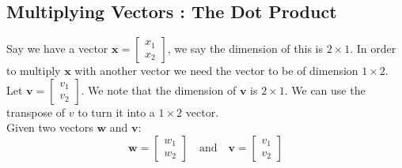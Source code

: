 \documentclass[9pt]{extarticle}
\theoremstyle{plain}
\theoremstyle{definition}
\theoremstyle{remark}
\begin{document}
\pagebreak

\subsection*{Multiplying Vectors : The Dot Product}
Say we have a vector $\mathbf{x} = \left[\begin{smallmatrix} x_1 \\ x_2 \end{smallmatrix}\right]$, we say the dimension of this is $2 \times 1$. In order to multiply $\mathbf{x}$ with another vector we need the vector to be of dimension $1 \times 2$. \\
Let $\mathbf{v} = \left[\begin{smallmatrix} v_1 \\ v_2 \end{smallmatrix}\right]$. We note that the dimension of $\mathbf{v}$ is $2 \times 1$. We can use the transpose of $v$ to turn it into a $1 \times 2$ vector.\\
Given two vectors $\mathbf{w}$ and $\mathbf{v}$:
$$\mathbf{w} = \begin{bmatrix} w_1 \\ w_2 \end{bmatrix} \quad \text{and} \quad \mathbf{v} = \begin{bmatrix} v_1 \\ v_2 \end{bmatrix}$$
\end{document}
